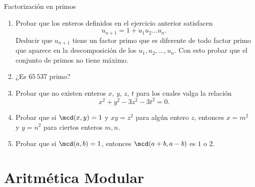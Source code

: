 \begin{section}{Factorización en primos}
\begin{enumerate}
    \item Probar que los enteros definidos en el ejercicio anterior satisfacen
    $$
    u_{n+1}= 1 + u_1u_2 \ldots u_n.
    $$
    Deducir que $u_{n+1}$ tiene un factor primo que es diferente de todo factor primo que aparece en la descomposición de los $u_1,u_2,\ldots,u_n$. Con esto probar que el conjunto de primos no tiene máximo.

    \item ¿Es $65\,537$ primo?

    \item Probar que no existen enteros $x$, $y$, $z$, $t$ para los cuales valga la relación
    $$x^2+y^2-3z^2-3t^2=0.$$

    \item Probar que si $\mcd(x,y)=1$ y $xy=z^2$ para algún entero $z$, entonces $x=m^2$ y $y=n^2$ para ciertos enteros $m,n$.

    \item Probar que si $\mcd(a,b)=1$, entonces $\mcd(a+b,a-b)$ es $1$ o $2$.
\end{enumerate}
\end{section}


\chapter[Aritmética Modular]{Aritmética Modular}\label{cap.aritmetica_modular}



